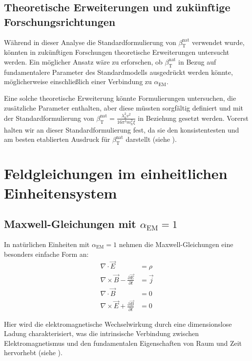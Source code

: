 \documentclass[12pt,a4paper]{article}
\newcommand{\alphaEM}{\alpha_{\text{EM}}}
\newcommand{\betaT}{\beta_{\text{T}}}
\begin{document}
	\subsection{Theoretische Erweiterungen und zukünftige Forschungsrichtungen}
	\label{subsec:theoretical_extensions}
	
	Während in dieser Analyse die Standardformulierung von \(\betaT^{\text{nat}}\) verwendet wurde, könnten in zukünftigen Forschungen theoretische Erweiterungen untersucht werden. Ein möglicher Ansatz wäre zu erforschen, ob \(\betaT^{\text{nat}}\) in Bezug auf fundamentalere Parameter des Standardmodells ausgedrückt werden könnte, möglicherweise einschließlich einer Verbindung zu \(\alphaEM\).
	
	Eine solche theoretische Erweiterung könnte Formulierungen untersuchen, die zusätzliche Parameter enthalten, aber diese müssten sorgfältig definiert und mit der Standardformulierung von \(\betaT^{\text{nat}} = \frac{\lambda_h^2 v^2}{16\pi^3 m_h^2 \xi}\) in Beziehung gesetzt werden. Vorerst halten wir an dieser Standardformulierung fest, da sie den konsistentesten und am besten etablierten Ausdruck für \(\betaT^{\text{nat}}\) darstellt (siehe \cite{pascher_params_2025}).
	
	\section{Feldgleichungen im einheitlichen Einheitensystem}
	\label{sec:field_equations}
	
	\subsection{Maxwell-Gleichungen mit \(\alphaEM = 1\)}
	\label{subsec:maxwell}
	
	In natürlichen Einheiten mit \(\alphaEM = 1\) nehmen die Maxwell-Gleichungen eine besonders einfache Form an:
	\begin{align}
		\nabla \cdot \vec{E} &= \rho \\
		\nabla \times \vec{B} - \frac{\partial \vec{E}}{\partial t} &= \vec{j} \\
		\nabla \cdot \vec{B} &= 0 \\
		\nabla \times \vec{E} + \frac{\partial \vec{B}}{\partial t} &= 0
	\end{align}
	
	Hier wird die elektromagnetische Wechselwirkung durch eine dimensionslose Ladung charakterisiert, was die intrinsische Verbindung zwischen Elektromagnetismus und den fundamentalen Eigenschaften von Raum und Zeit hervorhebt (siehe \cite{pascher_alpha_2025}).
	
\end{document}
